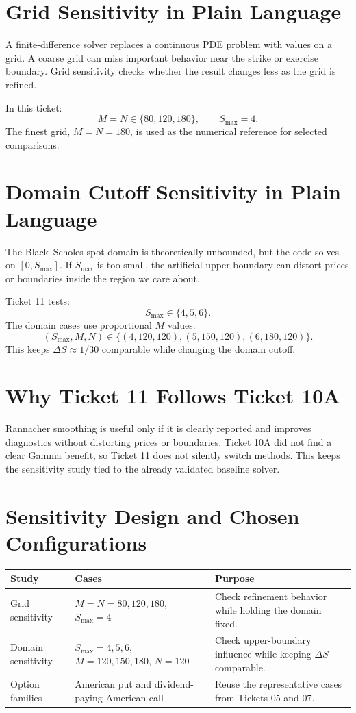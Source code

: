 \documentclass[11pt,a4paper]{article}
\begin{document}
\section{Grid Sensitivity in Plain Language}

A finite-difference solver replaces a continuous PDE problem with values on a grid. A coarse grid
can miss important behavior near the strike or exercise boundary. Grid sensitivity checks whether
the result changes less as the grid is refined.

In this ticket:
\[
M=N\in\{80,120,180\},\qquad S_{\max}=4.
\]
The finest grid, \(M=N=180\), is used as the numerical reference for selected comparisons.

\section{Domain Cutoff Sensitivity in Plain Language}

The Black--Scholes spot domain is theoretically unbounded, but the code solves on
\([0,S_{\max}]\). If \(S_{\max}\) is too small, the artificial upper boundary can distort prices
or boundaries inside the region we care about.

Ticket 11 tests:
\[
S_{\max}\in\{4,5,6\}.
\]
The domain cases use proportional \(M\) values:
\[
(S_{\max},M,N)\in\{(4,120,120),(5,150,120),(6,180,120)\}.
\]
This keeps \(\Delta S\approx 1/30\) comparable while changing the domain cutoff.

\section{Why Ticket 11 Follows Ticket 10A}

Rannacher smoothing is useful only if it is clearly reported and improves diagnostics without
distorting prices or boundaries. Ticket 10A did not find a clear Gamma benefit, so Ticket 11 does
not silently switch methods. This keeps the sensitivity study tied to the already validated
baseline solver.

\section{Sensitivity Design and Chosen Configurations}

\begin{longtable}{P{0.24\textwidth}P{0.18\textwidth}L{0.40\textwidth}}
\toprule
Study & Cases & Purpose \\
\midrule
\endhead
Grid sensitivity & \(M=N=80,120,180\), \(S_{\max}=4\) & Check refinement behavior while holding the domain fixed. \\
Domain sensitivity & \(S_{\max}=4,5,6\), \(M=120,150,180\), \(N=120\) & Check upper-boundary influence while keeping \(\Delta S\) comparable. \\
Option families & American put and dividend-paying American call & Reuse the representative cases from Tickets 05 and 07. \\
\bottomrule
\end{longtable}
\end{document}
